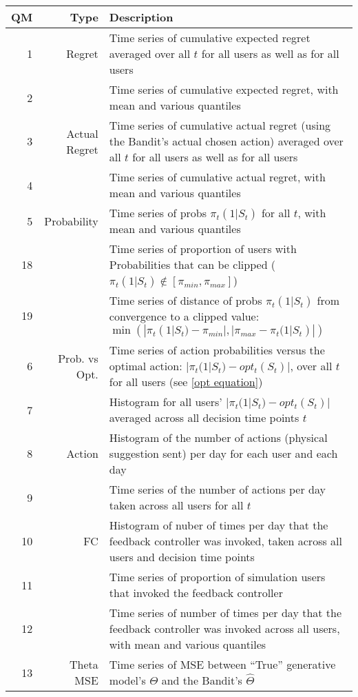 \begin{table}[H]
\centering
\begin{tabular}{rr|p{10cm}}
\toprule
QM &  Type &  Description \\ 
\midrule
1 & Regret & Time series of cumulative expected regret averaged over all $t$ for all users as well as for all users \\
2 & & Time series of cumulative expected regret, with mean and various quantiles \\
\hline
3 & Actual Regret & Time series of cumulative actual regret (using the Bandit's actual chosen action) averaged over all $t$ for all users as well as for all users \\
4 &  & Time series of cumulative actual regret, with mean and various quantiles \\
\hline
5 & Probability & Time series of probs $\pi_t(1 | S_t)$ for all $t$, with mean and various quantiles \\
18 & & Time series of proportion of users with Probabilities that can be clipped ($\pi_t(1 | S_t) \not\in [\pi_{min},\pi_{max}]$) \\
19 & & Time series of distance of probs $\pi_t(1 | S_t)$ from convergence to a clipped value: $\displaystyle \min \left(| \pi_t(1 | S_t) - \pi_{min}|, |\pi_{max} - \pi_t(1 | S_t)| \right)$ \\
\hline
6 & Prob. vs Opt. & Time series of action probabilities versus the optimal action: $|\pi_t(1 | S_t) - opt_t(S_t)|$, over all $t$ for all users (see \ref{opt equation}) \\
7 & & Histogram for all users' $|\pi_t(1 | S_t) - opt_t(S_t)|$ averaged across all decision time points $t$ \\
\hline
8 & Action & Histogram of the number of actions (physical suggestion sent) per day for each user and each day \\
9 & & Time series of the number of actions per day taken across all users for all $t$ \\
\hline
10 & FC & Histogram of nuber of times per day that the feedback controller was invoked, taken across all users and decision time points \\
11 &  & Time series of proportion of simulation users that invoked the feedback controller \\
12 &  & Time series of number of times per day that the feedback controller was invoked across all users, with mean and various quantiles \\
\hline
13 & Theta MSE & Time series of MSE between ``True'' generative model's $\Theta$ and the Bandit's $\hat{\Theta}$ \\

\end{tabular}
\end{table}

